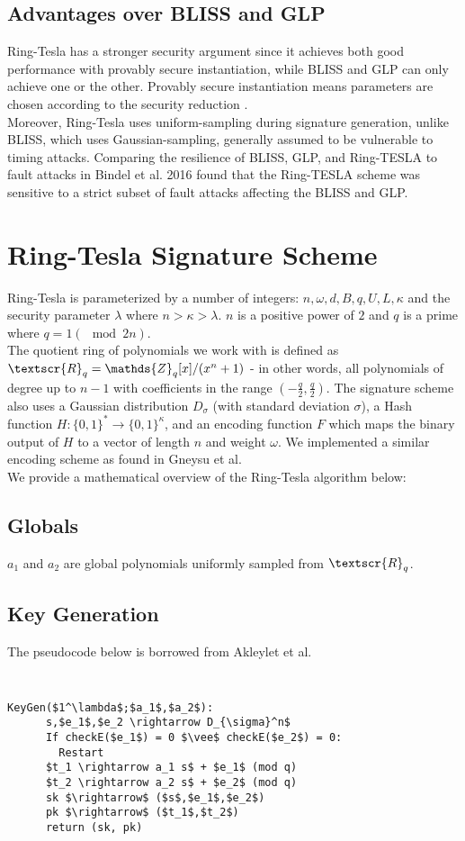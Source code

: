\documentclass[letterpaper,twocolumn,10pt]{article}
\begin{document}
\subsection{Advantages over BLISS and GLP}
Ring-Tesla has a stronger security argument since it achieves both good performance with provably secure instantiation, while BLISS and GLP can only achieve one or the other. Provably secure instantiation means parameters are chosen according to the security reduction \cite{rTesla}. \\
Moreover, Ring-Tesla uses uniform-sampling during signature generation, unlike BLISS, which uses Gaussian-sampling, generally assumed to be vulnerable to timing attacks. Comparing the resilience of BLISS, GLP, and Ring-TESLA to fault attacks in Bindel et al. 2016 \cite{faultAttacks} found that the Ring-TESLA scheme was sensitive to a strict subset of fault attacks affecting the BLISS and GLP.


\section{Ring-Tesla Signature Scheme}
Ring-Tesla is parameterized by a number of integers: $n, \omega, d, B, q, U, L, \kappa$ and the security parameter $\lambda$ where $n > \kappa > \lambda$. $n$ is a positive power of $2$ and $q$ is a prime where $q = 1 (\mod 2n)$. \\
The quotient ring of polynomials we work with is defined as $\textscr{R}_q = \mathds{Z}_q[x] / (x^n + 1)$ - in other words, all polynomials of degree up to $n-1$ with coefficients in the range $(-\frac{q}{2}, \frac{q}{2})$.
The signature scheme also uses a Gaussian distribution $D_{\sigma}$ (with standard deviation $\sigma$), a Hash function $H : \{0, 1\}^* \rightarrow \{0, 1\}^\kappa$, and an encoding function $F$ which maps the binary output of $H$ to a vector of length $n$ and weight $\omega$. We implemented a similar encoding scheme as found in Gneysu et al. \cite{encoding}\\

We provide a mathematical overview of the Ring-Tesla algorithm below:

\subsection{Globals}
$a_1$ and $a_2$ are global polynomials uniformly sampled from $\textscr{R}_q$.

\subsection{Key Generation}
The pseudocode below is borrowed from Akleylet et al. \cite{rTesla}
{\tt \small
  \begin{lstlisting}[mathescape, columns=flexible]
    KeyGen($1^\lambda$;$a_1$,$a_2$):
      s,$e_1$,$e_2 \rightarrow D_{\sigma}^n$ 
      If checkE($e_1$) = 0 $\vee$ checkE($e_2$) = 0:
        Restart
      $t_1 \rightarrow a_1 s$ + $e_1$ (mod q) 
      $t_2 \rightarrow a_2 s$ + $e_2$ (mod q) 
      sk $\rightarrow$ ($s$,$e_1$,$e_2$)
      pk $\rightarrow$ ($t_1$,$t_2$)
      return (sk, pk)
  \end{lstlisting} 
}
\end{document}
